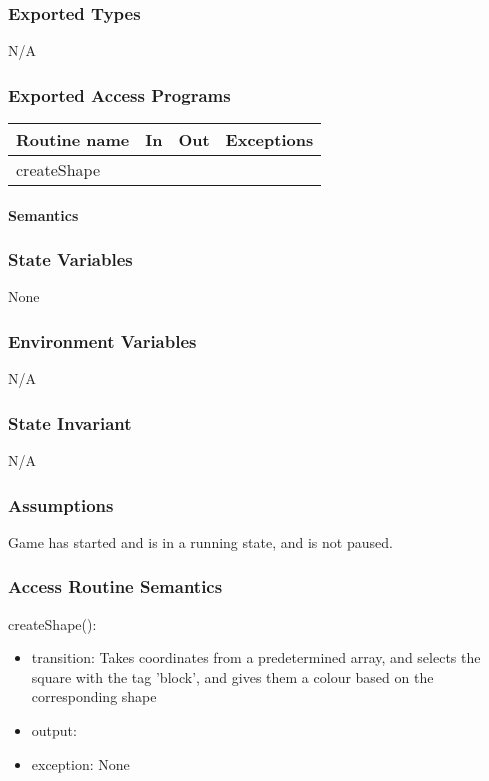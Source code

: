 \documentclass[12pt]{article}
\begin{document}
\subsubsection*{Exported Types}

N/A

\subsubsection* {Exported Access Programs}

\begin{tabular}{| l | l | l | l |}
\hline
\textbf{Routine name} & \textbf{In} & \textbf{Out} & \textbf{Exceptions}\\
\hline
createShape &  &  & \\
\hline
\end{tabular}

\paragraph* {Semantics}

\subsubsection*{State Variables}

None

\subsubsection*{Environment Variables}

N/A

\subsubsection*{State Invariant}

N/A

\subsubsection*{Assumptions}

Game has started and is in a running state, and is not paused.

\subsubsection* {Access Routine Semantics}

\noindent createShape():
\begin{itemize}
\item transition: Takes coordinates from a predetermined array, and selects the square with the tag 'block', and gives them a colour based on the corresponding shape
\item output:
\item exception: None
\end{itemize}
\end{document}
